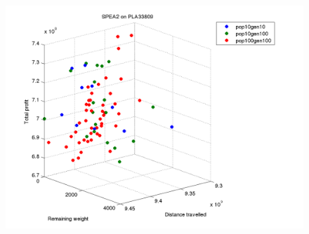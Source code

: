\documentclass[a4paper,12pt]{article}
\begin{document}
\begin{figure}[h]
  \centering
  \includegraphics[width=.8\linewidth]{q5graphs/pla33809_spea.png}
  \label{fig:a280279010}
\end{figure}
\end{document}
